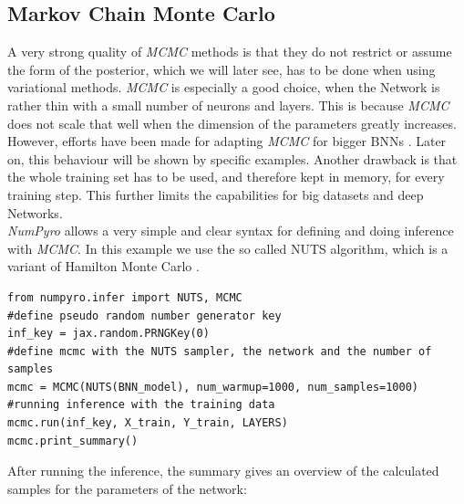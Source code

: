 \documentclass{article}
\begin{document}
\subsection{Markov Chain Monte Carlo}
A very strong quality of \textit{MCMC} methods is that they do not restrict or assume the form of the posterior, which we will later see, has to be done when using variational methods. \textit{MCMC} is especially a good choice, when the Network is rather thin with a small number of neurons and layers. This is because \textit{MCMC} does not scale that well when the dimension of the parameters greatly increases. However, efforts have been made for adapting \textit{MCMC} for bigger BNNs \cite{murphy}. Later on, this behaviour will be shown by specific examples. Another drawback is that the whole training set has to be used, and therefore kept in memory, for every training step. This further limits the capabilities for big datasets and deep Networks.\\
\textit{NumPyro} allows a very simple and clear syntax for defining and doing inference with \textit{MCMC}. In this example we use the so called NUTS algorithm, which is a variant of Hamilton Monte Carlo \cite{Brooks_2011, hoffman2011nouturnsampleradaptivelysetting}.
\begin{lstlisting}[caption= {Inference with NUTS},captionpos=t]
from numpyro.infer import NUTS, MCMC
#define pseudo random number generator key
inf_key = jax.random.PRNGKey(0)
#define mcmc with the NUTS sampler, the network and the number of samples
mcmc = MCMC(NUTS(BNN_model), num_warmup=1000, num_samples=1000)
#running inference with the training data 
mcmc.run(inf_key, X_train, Y_train, LAYERS)
mcmc.print_summary()
\end{lstlisting}
After running the inference, the summary gives an overview of the calculated samples for the parameters of the network:
\end{document}
